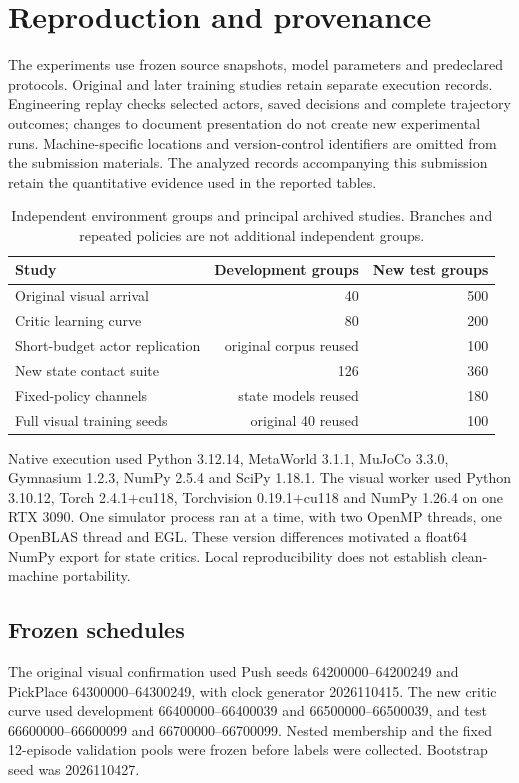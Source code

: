 \section{Reproduction and provenance}\label{s-app:reproduce}
The experiments use frozen source snapshots, model parameters and predeclared protocols. Original and later training studies retain separate execution records. Engineering replay checks selected actors, saved decisions and complete trajectory outcomes; changes to document presentation do not create new experimental runs. Machine-specific locations and version-control identifiers are omitted from the submission materials. The analyzed records accompanying this submission retain the quantitative evidence used in the reported tables.

\begin{table}[tb]\centering\small
\caption{Independent environment groups and principal archived studies. Branches and repeated policies are not additional independent groups.}\label{s-tab:groups}
\begin{tabular}{lrr}\toprule Study & Development groups & New test groups\\\midrule
Original visual arrival & 40 & 500\\
Critic learning curve & 80 & 200\\
Short-budget actor replication & original corpus reused & 100\\
New state contact suite & 126 & 360\\
Fixed-policy channels & state models reused & 180\\
Full visual training seeds & original 40 reused & 100\\\bottomrule\end{tabular}
\end{table}

Native execution used Python 3.12.14, MetaWorld 3.1.1, MuJoCo 3.3.0, Gymnasium 1.2.3, NumPy 2.5.4 and SciPy 1.18.1. The visual worker used Python 3.10.12, Torch 2.4.1+cu118, Torchvision 0.19.1+cu118 and NumPy 1.26.4 on one RTX 3090. One simulator process ran at a time, with two OpenMP threads, one OpenBLAS thread and EGL. These version differences motivated a float64 NumPy export for state critics. Local reproducibility does not establish clean-machine portability.

\subsection{Frozen schedules}
The original visual confirmation used Push seeds 64200000--64200249 and PickPlace 64300000--64300249, with clock generator 2026110415. The new critic curve used development 66400000--66400039 and 66500000--66500039, and test 66600000--66600099 and 66700000--66700099. Nested membership and the fixed 12-episode validation pools were frozen before labels were collected. Bootstrap seed was 2026110427.

